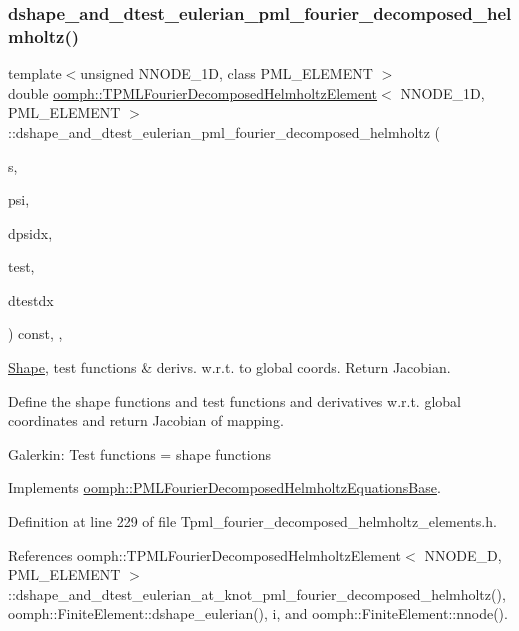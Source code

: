 \subsubsection{\texorpdfstring{dshape\+\_\+and\+\_\+dtest\+\_\+eulerian\+\_\+pml\+\_\+fourier\+\_\+decomposed\+\_\+helmholtz()}{dshape\_and\_dtest\_eulerian\_pml\_fourier\_decomposed\_helmholtz()}}
{\footnotesize\ttfamily template$<$unsigned N\+N\+O\+D\+E\+\_\+1D, class P\+M\+L\+\_\+\+E\+L\+E\+M\+E\+NT $>$ \\
double \hyperlink{classoomph_1_1TPMLFourierDecomposedHelmholtzElement}{oomph\+::\+T\+P\+M\+L\+Fourier\+Decomposed\+Helmholtz\+Element}$<$ N\+N\+O\+D\+E\+\_\+1D, P\+M\+L\+\_\+\+E\+L\+E\+M\+E\+NT $>$\+::dshape\+\_\+and\+\_\+dtest\+\_\+eulerian\+\_\+pml\+\_\+fourier\+\_\+decomposed\+\_\+helmholtz (\begin{DoxyParamCaption}\item[{const \hyperlink{classoomph_1_1Vector}{Vector}$<$ double $>$ \&}]{s,  }\item[{\hyperlink{classoomph_1_1Shape}{Shape} \&}]{psi,  }\item[{\hyperlink{classoomph_1_1DShape}{D\+Shape} \&}]{dpsidx,  }\item[{\hyperlink{classoomph_1_1Shape}{Shape} \&}]{test,  }\item[{\hyperlink{classoomph_1_1DShape}{D\+Shape} \&}]{dtestdx }\end{DoxyParamCaption}) const\hspace{0.3cm}{\ttfamily [inline]}, {\ttfamily [protected]}, {\ttfamily [virtual]}}



\hyperlink{classoomph_1_1Shape}{Shape}, test functions \& derivs. w.\+r.\+t. to global coords. Return Jacobian. 

Define the shape functions and test functions and derivatives w.\+r.\+t. global coordinates and return Jacobian of mapping.

Galerkin\+: Test functions = shape functions 

Implements \hyperlink{classoomph_1_1PMLFourierDecomposedHelmholtzEquationsBase_ac00e3f75197b37ff99a343b88b36284f}{oomph\+::\+P\+M\+L\+Fourier\+Decomposed\+Helmholtz\+Equations\+Base}.



Definition at line 229 of file Tpml\+\_\+fourier\+\_\+decomposed\+\_\+helmholtz\+\_\+elements.\+h.



References oomph\+::\+T\+P\+M\+L\+Fourier\+Decomposed\+Helmholtz\+Element$<$ N\+N\+O\+D\+E\+\_\+D, P\+M\+L\+\_\+\+E\+L\+E\+M\+E\+N\+T $>$\+::dshape\+\_\+and\+\_\+dtest\+\_\+eulerian\+\_\+at\+\_\+knot\+\_\+pml\+\_\+fourier\+\_\+decomposed\+\_\+helmholtz(), oomph\+::\+Finite\+Element\+::dshape\+\_\+eulerian(), i, and oomph\+::\+Finite\+Element\+::nnode().




